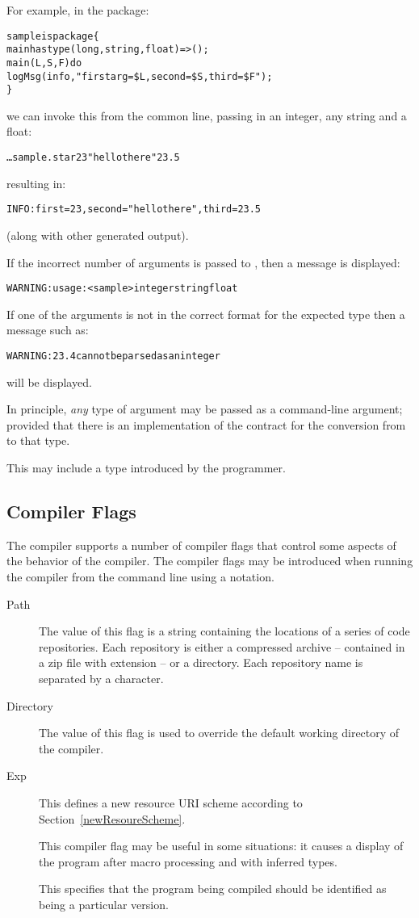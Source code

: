 For example, in the  package:
\begin{alltt}
sample is package\{
  main has type (long,string,float)=>();
  main(L,S,F) do
    logMsg(info,"first arg=\$L, second=\$S, third=\$F");
\}
\end{alltt}
we can invoke this from the common line, passing in an integer, any string and a float:
\begin{alltt}
\ldots sample.star 23 "hello there" 23.5
\end{alltt}
resulting in:
\begin{alltt}
INFO: first=23, second="hello there", third=23.5
\end{alltt}
(along with other generated output).

If the incorrect number of arguments is passed to , then a message is displayed:
\begin{alltt}
WARNING: usage: <sample> integer string float
\end{alltt}
If one of the arguments is not in the correct format for the expected type then a message such as:
\begin{alltt}
WARNING: 23.4 cannot be parsed as an integer
\end{alltt}
will be displayed.
\begin{aside}
In principle, \emph{any} type of argument may be passed as a command-line argument; provided that there is an implementation of the  contract for the conversion from  to that type. 

This may include a type introduced by the programmer.
\end{aside}

\subsection{Compiler Flags}
\label{compileFlags}
The compiler supports a number of compiler flags that control some aspects of the behavior of the compiler. The compiler flags may be introduced when running the compiler from the command line using a  notation.
\begin{description}
\item[Path] The value of this flag is a string containing the locations of a series of code repositories. Each repository is either a compressed archive -- contained in a zip file with extension  -- or a directory. Each repository name is separated by a \q{:} character.
\item[Directory] The value of this flag is used to override the default working directory of the compiler.
\item[Exp] This defines a new resource URI scheme according to Section~\vref{newResoureScheme}.
\item[] This compiler flag may be useful in some situations: it causes a display of the program after macro processing and with inferred types. 
\item[] This specifies that the program being compiled should be identified as being a particular version.
\end{description}
